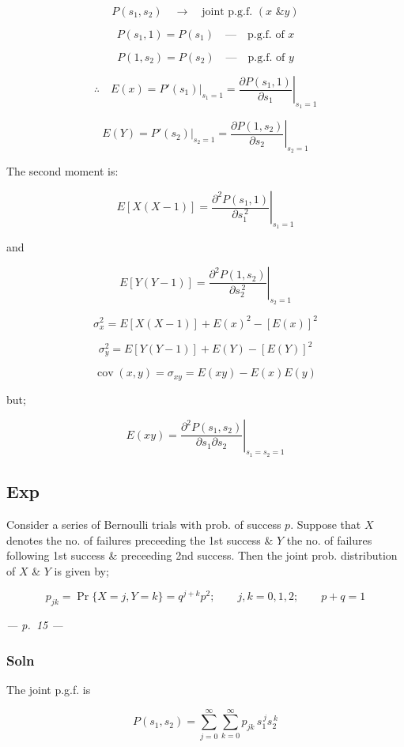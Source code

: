 \documentclass[
]{article}
\begin{document}
\[P(s_1, s_2) \quad \rightarrow \quad \text{joint p.g.f. } (x \text{ \& } y)\]

\[P(s_1, 1) = P(s_1) \quad \text{---} \quad \text{p.g.f. of } x\]

\[P(1, s_2) = P(s_2) \quad \text{---} \quad \text{p.g.f. of } y\]

\[\therefore \quad E(x) = P'(s_1)\big|_{s_1 = 1} = \left. \frac{\partial P(s_1, 1)}{\partial s_1} \right|_{s_1 = 1}\]

\[E(Y) = P'(s_2)\big|_{s_2 = 1} = \left. \frac{\partial P(1, s_2)}{\partial s_2} \right|_{s_2 = 1}\]

The second moment is:

\[E\left[X(X-1)\right] = \left. \frac{\partial^2 P(s_1, 1)}{\partial s_1^{\,2}} \right|_{s_1 = 1}\]

and

\[E\left[Y(Y-1)\right] = \left. \frac{\partial^2 P(1, s_2)}{\partial s_2^{\,2}} \right|_{s_2 = 1}\]

\[\sigma_x^2 = E\left[X(X-1)\right] + E(x)^2 - \left[E(x)\right]^2\]

\[\sigma_y^2 = E\left[Y(Y-1)\right] + E(Y) - \left[E(Y)\right]^2\]

\[\operatorname{cov}(x, y) = \sigma_{xy} = E(xy) - E(x)E(y)\]

but;

\[E(xy) = \left. \frac{\partial^2 P(s_1, s_2)}{\partial s_1 \partial s_2} \right|_{s_1 = s_2 = 1}\]

\subsection{Exp}\label{exp-7}

Consider a series of Bernoulli trials with prob. of success \(p\).
Suppose that \(X\) denotes the no. of failures preceeding the 1st
success \& \(Y\) the no. of failures following 1st success \& preceeding
2nd success. Then the joint prob. distribution of \(X\) \& \(Y\) is
given by;

\[p_{jk} = \Pr\{X = j, Y = k\} = q^{j+k} p^2; \qquad j, k = 0, 1, 2; \qquad p + q = 1\]

\emph{--- p.~15 ---}

\subsubsection{Soln}\label{soln-4}

The joint p.g.f. is

\[P(s_1, s_2) = \sum_{j=0}^{\infty} \sum_{k=0}^{\infty} p_{jk}\, s_1^{\,j} s_2^{\,k}\]
\end{document}

